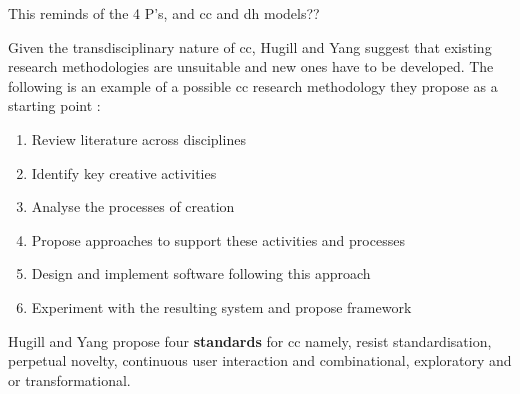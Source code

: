 \begin{draft}
  This reminds of the 4 P’s, and \gls{cc} and \gls{dh} models??
\end{draft}


Given the transdisciplinary nature of \gls{cc}, Hugill and Yang suggest that existing research methodologies are unsuitable and new ones have to be developed. The following is an example of a possible \gls{cc} research methodology they propose as a starting point \citep[p.17]{Hugill2013c}:

\begin{enumerate}
  \item Review literature across disciplines
  \item Identify key creative activities
  \item Analyse the processes of creation
  \item Propose approaches to support these activities and processes
  \item Design and implement software following this approach
  \item Experiment with the resulting system and propose framework
\end{enumerate}

Hugill and Yang propose four \textbf{standards} for \gls{cc} \citep[p.17]{Hugill2013c} namely, resist standardisation, perpetual novelty, continuous user interaction and combinational, exploratory and or transformational.


